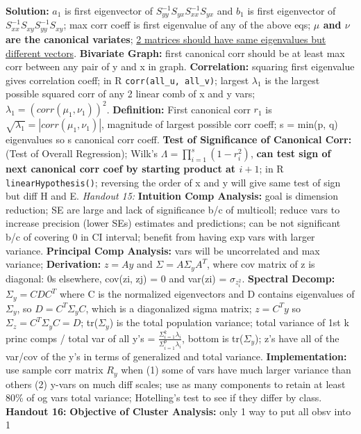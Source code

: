 \documentclass[9pt]{extarticle}
\begin{document}
\textbf{Solution:} $a_1$ is first eigenvector of $S_{yy}^{-1}S_{yx}S_{xx}^{-1}
S_{yx}$ and $b_1$ is first eigenvector of $S_{xx}^{-1}S_{xy}S_{yy}^{-1}
S_{xy}$; max corr coeff is first eigenvalue of any of the above eqs;
\textbf{$\mu$ and $\nu$ are the canonical variates}; \underline{2 matrices 
should have same eigenvalues but different vectors}.
\textbf{Bivariate Graph:} first canonical corr should be at least max corr 
between any pair of y and x in graph.
\textbf{Correlation:} squaring first eigenvalue gives correlation coeff; in R 
\texttt{corr(all\_u, all\_v)}; largest $\lambda_1$ is the largest possible 
squared corr of any 2 linear comb of x and y vars; $\lambda_1 = (corr(
\mu_1, \nu_1))^2$.
\textbf{Definition:} First canonical corr $r_1$ is $\sqrt{\lambda_1} = 
|corr(\mu_1, \nu_1)|$, magnitude of largest possible corr coeff; s = min(p, q) 
eigenvalues so s canonical corr coeff.
\textbf{Test of Significance of Canonical Corr:} (Test of Overall Regression);
Wilk's $\Lambda = \prod_{i=1}^s (1 - r_i^2)$, \textbf{can test sign of next 
canonical corr coef by starting product at $i+1$}; in R 
\texttt{linearHypothesis()}; reversing the order of x and y will give same
test of sign but diff H and E.
\textit{Handout 15:}
\textbf{Intuition Comp Analysis:} goal is dimension reduction; SE are large and 
lack of significance b/c of multicoll; reduce vars to increase precision (lower 
SEs) estimates and predictions; can be not significant b/c of covering 0 in CI
interval; benefit from having exp vars with larger variance.
\textbf{Principal Comp Analysis:} vars will be uncorrelated and max variance;
\textbf{Derivation:} $z = Ay$ and $\Sigma = A\Sigma_yA^T$, where cov matrix of
z is diagonal: 0s elsewhere, cov(zi, zj) = 0 and var(zi) = $\sigma_{z_i^2}$.
\textbf{Spectral Decomp:} $\Sigma_y = CDC^T$ where C is the normalized
eigenvectors and D contains eigenvalues of $\Sigma_y$, so $D = C^T\Sigma_yC$,
which is a diagonalized sigma matrix; $z = C^Ty$ so $\Sigma_z = C^T\Sigma_yC = 
D$; tr($\Sigma_y$) is the total population variance; total variance of 1st k 
princ comps / total var of all y's = $\frac{\Sigma_{i=1}^k \lambda_i}{\Sigma_{i=1}^p
\lambda_i}$, bottom is tr($\Sigma_y$); z's have all of the var/cov of the 
y's in terms of generalized and total variance.
\textbf{Implementation:} use sample corr matrix $R_y$ when (1) some of vars have 
much larger variance than others (2) y-vars on much diff scales; use as many 
components to retain at least 80\% of og vars total variance; Hotelling's test 
to see if they differ by class.
\textbf{Handout 16:}
\textbf{Objective of Cluster Analysis:} only 1 way to put all obsv into 1 
\end{document}
